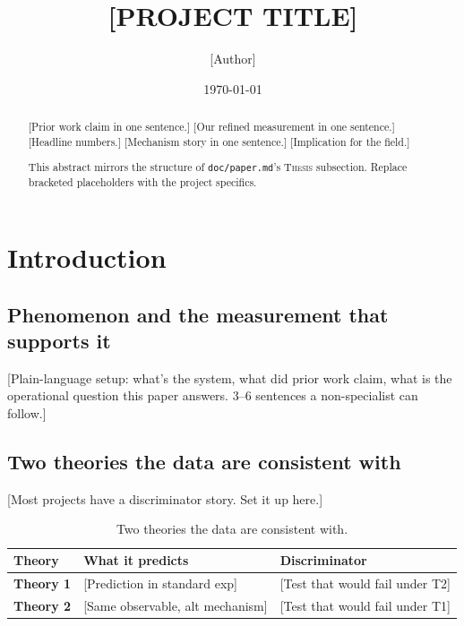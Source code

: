\documentclass[11pt, letterpaper]{article}
\title{[PROJECT TITLE]\\
  [Subtitle: the one-sentence thesis]}
\author{[Author]}
\affil{[Affiliation]}
\date{\today}
\begin{document}
\maketitle

\begin{abstract}
[Prior work claim in one sentence.] [Our refined measurement in one
sentence.] [Headline numbers.] [Mechanism story in one sentence.]
[Implication for the field.]

This abstract mirrors the structure of \texttt{doc/paper.md}'s
\textsc{Thesis} subsection. Replace bracketed placeholders with the
project specifics.
\end{abstract}

\section{Introduction}
\label{sec:intro}

\subsection{Phenomenon and the measurement that supports it}
[Plain-language setup: what's the system, what did prior work claim,
what is the operational question this paper answers. 3--6 sentences a
non-specialist can follow.]

\subsection{Two theories the data are consistent with}

[Most projects have a discriminator story. Set it up here.]

\begin{table}[h]
\centering
\small
\caption{Two theories the data are consistent with.}
\label{tab:theories}
\begin{tabular}{p{}p{}p{}}
\toprule
\textbf{Theory} & \textbf{What it predicts} & \textbf{Discriminator}\\
\midrule
\textbf{Theory 1} & [Prediction in standard exp] & [Test that would fail under T2] \\
\textbf{Theory 2} & [Same observable, alt mechanism] & [Test that would fail under T1] \\
\bottomrule
\end{tabular}
\end{table}
\end{document}
